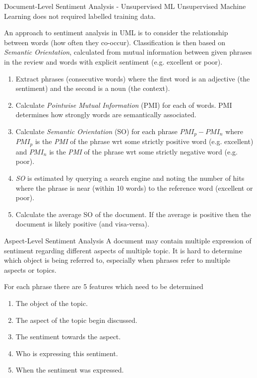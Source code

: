 \documentclass[11pt,a4paper]{article}
\begin{document}
\begin{proposition}{Document-Level Sentiment Analysis - Unsupervised ML}
  Unsupervised Machine Learning does not required labelled training data.
  \par An approach to sentiment analysis in UML is to consider the relationship between words (how often they co-occur). Classification is then based on \textit{Semantic Orientation}, calculated from mutual information between given phrases in the review and words with explicit sentiment (e.g. excellent or poor).
  \begin{enumerate}
    \item Extract phrases (consecutive words) where the first word is an adjective (the sentiment) and the second is a noun (the context).
    \item Calculate \textit{Pointwise Mutual Information} (PMI) for each of words. PMI determines how strongly words are semantically associated.
    \item Calculate \textit{Semantic Orientation} (SO) for each phrase $PMI_p-PMI_n$ where $PMI_p$ is the \textit{PMI} of the phrase wrt some strictly positive word (e.g. excellent) and $PMI_n$ is the \textit{PMI} of the phrase wrt some strictly negative word (e.g. poor).
    \item \textit{SO} is estimated by querying a search engine and noting the number of hits where the phrase is near (within 10 words) to the reference word (excellent or poor).
    \item Calculate the average SO of the document. If the average is positive then the document is likely positive (and visa-versa).
  \end{enumerate}
\end{proposition}

\begin{proposition}{Aspect-Level Sentiment Analysis}
  A document may contain multiple expression of sentiment regarding different aspects of multiple topic. It is hard to determine which object is being referred to, especially when phrases refer to multiple aspects or topics.
  \par For each phrase there are 5 features which need to be determined
  \begin{enumerate}
    \item The object of the topic.
    \item The aspect of the topic begin discussed.
    \item The sentiment towards the aspect.
    \item Who is expressing this sentiment.
    \item When the sentiment was expressed.
  \end{enumerate}
\end{proposition}
\end{document}
